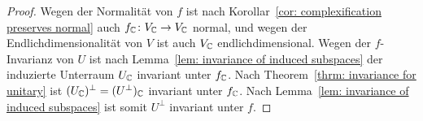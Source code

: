 \documentclass[a4paper,10pt]{article}
\begin{document}
\begin{proof}
  Wegen der Normalität von $f$ ist nach Korollar~\ref{cor: complexification preserves normal} auch $f_{\mathbb{C}} \colon V_{\mathbb{C}} \to V_{\mathbb{C}}$ normal, und wegen der Endlichdimensionalität von $V$ ist auch $V_{\mathbb{C}}$ endlichdimensional.
  Wegen der $f$-Invarianz von $U$ ist nach Lemma~\ref{lem: invariance of induced subspaces} der induzierte Unterraum $U_{\mathbb{C}}$ invariant unter $f_{\mathbb{C}}$.
  Nach Theorem~\ref{thrm: invariance for unitary} ist $(U_{\mathbb{C}})^\perp = (U^\perp)_{\mathbb{C}}$ invariant unter $f_{\mathbb{C}}$.
  Nach Lemma~\ref{lem: invariance of induced subspaces} ist somit $U^\perp$ invariant unter $f$.
\end{proof}
\end{document}
